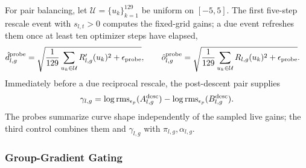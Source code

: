\documentclass{article}
\newcommand{\rms}{\operatorname{rms}}
\begin{document}
For pair balancing, let $\mathcal U=\{u_k\}_{k=1}^{129}$ be uniform on
$[-5,5]$.  The first five-step rescale event with $s_{l,t}>0$ computes the
fixed-grid gains; a due event refreshes them once at least ten optimizer steps
have elapsed,
\begin{align}
    \hat d^{\rm probe}_{l,g}
    &=
    \sqrt{\frac{1}{129}\sum_{u_k\in\mathcal U}R'_{l,g}(u_k)^2
    +\epsilon_{\rm probe}},
    \qquad
    \hat o^{\rm probe}_{l,g}
    =
    \sqrt{\frac{1}{129}\sum_{u_k\in\mathcal U}R_{l,g}(u_k)^2
    +\epsilon_{\rm probe}}.
    \label{eq:probe-gains}
\end{align}
Immediately before a due reciprocal rescale, the post-descent pair supplies
\begin{align}
    \gamma_{l,g}
    =
    \log\rms_{\epsilon_p}(A^{\rm desc}_{l,g})
    -\log\rms_{\epsilon_p}(B^{\rm desc}_{l,g}).
    \label{eq:post-step-pair-ratio}
\end{align}
The probes summarize curve shape independently of the sampled live gains; the
third control combines them and $\gamma_{l,g}$ with $\pi_{l,g},\alpha_{l,g}$.

\subsubsection{Group-Gradient Gating}
\end{document}
